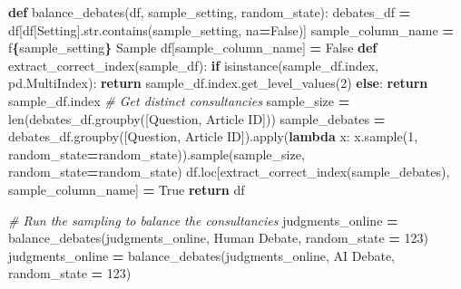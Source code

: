 \documentclass[
]{article}
\newenvironment{Shaded}{\begin{snugshade}}{\end{snugshade}}
\newcommand{\BuiltInTok}[1]{#1}
\newcommand{\CommentTok}[1]{\textcolor[rgb]{0.56,0.35,0.01}{\textit{#1}}}
\newcommand{\ControlFlowTok}[1]{\textcolor[rgb]{0.13,0.29,0.53}{\textbf{#1}}}
\newcommand{\DecValTok}[1]{\textcolor[rgb]{0.00,0.00,0.81}{#1}}
\newcommand{\KeywordTok}[1]{\textcolor[rgb]{0.13,0.29,0.53}{\textbf{#1}}}
\newcommand{\NormalTok}[1]{#1}
\newcommand{\OperatorTok}[1]{\textcolor[rgb]{0.81,0.36,0.00}{\textbf{#1}}}
\newcommand{\SpecialCharTok}[1]{\textcolor[rgb]{0.81,0.36,0.00}{\textbf{#1}}}
\newcommand{\SpecialStringTok}[1]{\textcolor[rgb]{0.31,0.60,0.02}{#1}}
\newcommand{\StringTok}[1]{\textcolor[rgb]{0.31,0.60,0.02}{#1}}
\newcommand{\VariableTok}[1]{\textcolor[rgb]{0.00,0.00,0.00}{#1}}
\begin{document}
\begin{Shaded}
\begin{Highlighting}[]
\KeywordTok{def}\NormalTok{ balance\_debates(df, sample\_setting, random\_state):}
\NormalTok{    debates\_df }\OperatorTok{=}\NormalTok{ df[df[}\StringTok{\textquotesingle{}Setting\textquotesingle{}}\NormalTok{].}\BuiltInTok{str}\NormalTok{.contains(sample\_setting, na}\OperatorTok{=}\VariableTok{False}\NormalTok{)]}
\NormalTok{    sample\_column\_name }\OperatorTok{=} \SpecialStringTok{f\textquotesingle{}}\SpecialCharTok{\{}\NormalTok{sample\_setting}\SpecialCharTok{\}}\SpecialStringTok{ Sample\textquotesingle{}}
\NormalTok{    df[sample\_column\_name] }\OperatorTok{=} \VariableTok{False}
    \KeywordTok{def}\NormalTok{ extract\_correct\_index(sample\_df):}
        \ControlFlowTok{if} \BuiltInTok{isinstance}\NormalTok{(sample\_df.index, pd.MultiIndex):}
            \ControlFlowTok{return}\NormalTok{ sample\_df.index.get\_level\_values(}\DecValTok{2}\NormalTok{)}
        \ControlFlowTok{else}\NormalTok{:}
            \ControlFlowTok{return}\NormalTok{ sample\_df.index}
    \CommentTok{\# Get distinct consultancies}
\NormalTok{    sample\_size }\OperatorTok{=} \BuiltInTok{len}\NormalTok{(debates\_df.groupby([}\StringTok{\textquotesingle{}Question\textquotesingle{}}\NormalTok{, }\StringTok{\textquotesingle{}Article ID\textquotesingle{}}\NormalTok{]))}
\NormalTok{    sample\_debates }\OperatorTok{=}\NormalTok{ debates\_df.groupby([}\StringTok{\textquotesingle{}Question\textquotesingle{}}\NormalTok{, }\StringTok{\textquotesingle{}Article ID\textquotesingle{}}\NormalTok{]).}\BuiltInTok{apply}\NormalTok{(}\KeywordTok{lambda}\NormalTok{ x: x.sample(}\DecValTok{1}\NormalTok{, random\_state}\OperatorTok{=}\NormalTok{random\_state)).sample(sample\_size, random\_state}\OperatorTok{=}\NormalTok{random\_state)}
\NormalTok{    df.loc[extract\_correct\_index(sample\_debates), sample\_column\_name] }\OperatorTok{=} \VariableTok{True}
    \ControlFlowTok{return}\NormalTok{ df}

\CommentTok{\# Run the sampling to balance the consultancies}
\NormalTok{judgments\_online }\OperatorTok{=}\NormalTok{ balance\_debates(judgments\_online, }\StringTok{\textquotesingle{}Human Debate\textquotesingle{}}\NormalTok{, random\_state }\OperatorTok{=} \DecValTok{123}\NormalTok{)}
\NormalTok{judgments\_online }\OperatorTok{=}\NormalTok{ balance\_debates(judgments\_online, }\StringTok{\textquotesingle{}AI Debate\textquotesingle{}}\NormalTok{, random\_state }\OperatorTok{=} \DecValTok{123}\NormalTok{)}
\end{Highlighting}
\end{Shaded}
\end{document}
